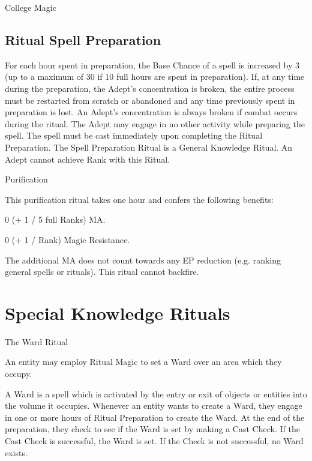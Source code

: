 \begin{Chapter}{College Magic}
\subsection{Ritual Spell Preparation}

For each hour spent in preparation, the Base Chance of a spell is
increased by 3 (up to a maximum of 30 if 10 full hours are spent in
preparation).  If, at any time during the preparation, the Adept’s
concentration is broken, the entire process must be restarted from
scratch or abandoned and any time previously spent in preparation is
lost. An Adept’s concentration is always broken if combat occurs
during the ritual. The Adept may engage in no other activity while
preparing the spell.  The spell must be cast immediately upon
completing the Ritual Preparation.  The Spell Preparation Ritual is
a General Knowledge Ritual.  An Adept cannot achieve Rank with this
Ritual.


\begin{ritual}{Purification}

\begin{effects}
This purification ritual takes one hour and 
confers the following benefits:  
\begin{Itemize}
\item 0 (+ 1 / 5 full Ranks) MA.  

\item 0 (+ 1 / Rank) Magic Resistance. 
\end{Itemize}
The additional MA does not count towards any EP reduction (e.g.
ranking general spells or rituals).  This ritual cannot backfire.
\end{effects}
\end{ritual}


\section{Special Knowledge Rituals}

\begin{ritual}{The Ward Ritual}
\begin{effects}
An entity may employ Ritual Magic to set a Ward over an area which
they occupy.

A Ward is a spell which is activated by the entry or exit of objects
or entities into the volume it occupies.  Whenever an entity wants to
create a Ward, they engage in one or more hours of Ritual Preparation
to create the Ward. At the end of the preparation, they check to see
if the Ward is set by making a Cast Check.  If the Cast Check is
successful, the Ward is set.  If the Check is not successful, no Ward
exists.


\end{effects}
\end{ritual}
\end{Chapter}
